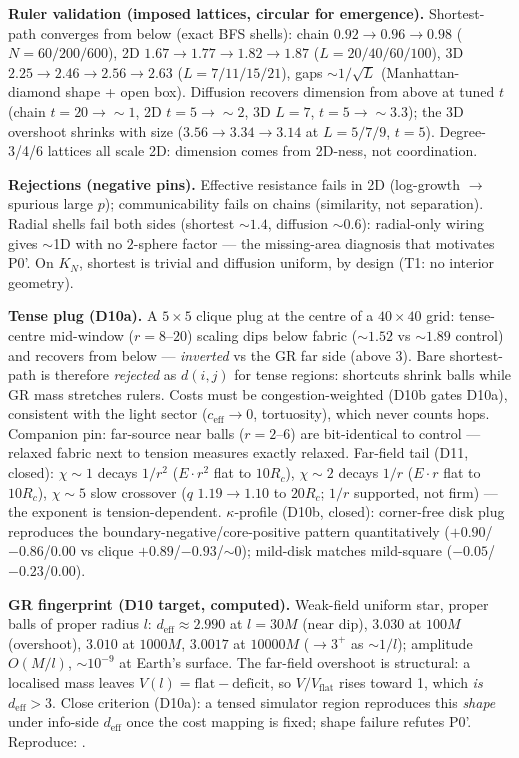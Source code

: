 \documentclass[11pt]{article}
\begin{document}
\textbf{Ruler validation (imposed lattices, circular for emergence).}
Shortest-path converges from below (exact BFS shells): chain $0.92 \to 0.96 \to
0.98$ ($N = 60/200/600$), 2D $1.67 \to 1.77 \to 1.82 \to 1.87$
($L = 20/40/60/100$), 3D $2.25 \to 2.46 \to 2.56 \to 2.63$ ($L = 7/11/15/21$),
gaps $\sim 1/\sqrt{L}$ (Manhattan-diamond shape + open box). Diffusion
recovers dimension from above at tuned $t$ (chain $t = 20 \to \sim 1$, 2D
$t = 5 \to \sim 2$, 3D $L = 7$, $t = 5 \to \sim 3.3$); the 3D overshoot shrinks
with size ($3.56 \to 3.34 \to 3.14$ at $L = 5/7/9$, $t = 5$). Degree-3/4/6
lattices all scale 2D: dimension comes from 2D-ness, not coordination.

\textbf{Rejections (negative pins).} Effective resistance fails in 2D
(log-growth $\to$ spurious large $p$); communicability fails on chains
(similarity, not separation). Radial shells fail both sides (shortest
$\sim 1.4$, diffusion $\sim 0.6$): radial-only wiring gives $\sim$1D with no
$2$-sphere factor --- the missing-area diagnosis that motivates P0'. On $K_N$,
shortest is trivial and diffusion uniform, by design (T1: no interior geometry).

\textbf{Tense plug (D10a).} A $5\times5$ clique plug at the centre of a
$40\times40$ grid: tense-centre mid-window ($r = 8$--$20$) scaling dips below
fabric ($\sim 1.52$ vs $\sim 1.89$ control) and recovers from below ---
\emph{inverted} vs the GR far side (above 3). Bare shortest-path is therefore
\emph{rejected} as $d(i,j)$ for tense regions: shortcuts shrink balls while GR
mass stretches rulers. Costs must be congestion-weighted (D10b gates D10a),
consistent with the light sector ($c_{\mathrm{eff}} \to 0$, tortuosity), which
never counts hops. Companion pin: far-source near balls ($r = 2$--$6$) are
bit-identical to control --- relaxed fabric next to tension measures exactly
relaxed. Far-field tail (D11, closed): $\chi{\sim}1$ decays $1/r^2$
($E{\cdot}r^2$ flat to $10R_c$), $\chi{\sim}2$ decays $1/r$ ($E{\cdot}r$
flat to $10R_c$), $\chi{\sim}5$ slow crossover ($q$ $1.19{\to}1.10$
to $20R_c$; $1/r$ supported, not firm) --- the exponent is
tension-dependent. $\kappa$-profile (D10b, closed): corner-free disk plug
reproduces the boundary-negative/core-positive pattern quantitatively
($+0.90$/$-0.86$/$0.00$ vs clique $+0.89$/$-0.93$/$\sim$0); mild-disk
matches mild-square ($-0.05$/$-0.23$/$0.00$).

\textbf{GR fingerprint (D10 target, computed).} Weak-field uniform star, proper
balls of proper radius $l$: $d_{\mathrm{eff}} \approx 2.990$ at $l = 30M$
(near dip), $3.030$ at $100M$ (overshoot), $3.010$ at $1000M$, $3.0017$ at
$10000M$ ($\to 3^+$ as $\sim 1/l$); amplitude $O(M/l)$, $\sim 10^{-9}$ at
Earth's surface. The far-field overshoot is structural: a localised mass leaves
$V(l) = \mathrm{flat} - \mathrm{deficit}$, so $V/V_{\mathrm{flat}}$ rises
toward 1, which \emph{is} $d_{\mathrm{eff}} > 3$. Close criterion (D10a): a
tensed simulator region reproduces this \emph{shape} under info-side
$d_{\mathrm{eff}}$ once the cost mapping is fixed; shape failure refutes P0'.
Reproduce: .
\end{document}
